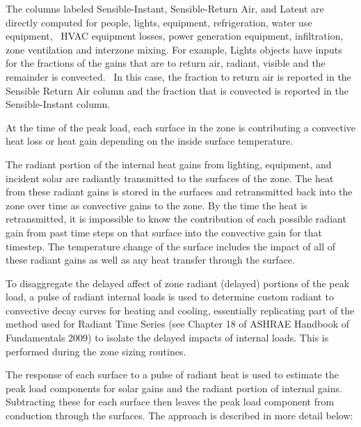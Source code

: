 The columns labeled Sensible-Instant, Sensible-Return Air, and Latent are directly computed for people, lights, equipment, refrigeration, water use equipment,~ HVAC equipment losses, power generation equipment, infiltration, zone ventilation and interzone mixing. For example, Lights objects have inputs for the fractions of the gains that are to return air, radiant, visible and the remainder is convected.~ In this case, the fraction to return air is reported in the Sensible Return Air column and the fraction that is convected is reported in the Sensible-Instant column.

At the time of the peak load, each surface in the zone is contributing a convective heat loss or heat gain depending on the inside surface temperature.

The radiant portion of the internal heat gains from lighting, equipment, and incident solar are radiantly transmitted to the surfaces of the zone. The heat from these radiant gains is stored in the surfaces and retransmitted back into the zone over time as convective gains to the zone. By the time the heat is retransmitted, it is impossible to know the contribution of each possible radiant gain from past time steps on that surface into the convective gain for that timestep. The temperature change of the surface includes the impact of all of these radiant gains as well as any heat transfer through the surface.

To disaggregate the delayed affect of zone radiant (delayed) portions of the peak load, a pulse of radiant internal loads is used to determine custom radiant to convective decay curves for heating and cooling, essentially replicating part of the method used for Radiant Time Series (see Chapter 18 of ASHRAE Handbook of Fundamentals 2009) to isolate the delayed impacts of internal loads. This is performed during the zone sizing routines.

The response of each surface to a pulse of radiant heat is used to estimate the peak load components for solar gains and the radiant portion of internal gains. Subtracting these for each surface then leaves the peak load component from conduction through the surfaces. The approach is described in more detail below:

